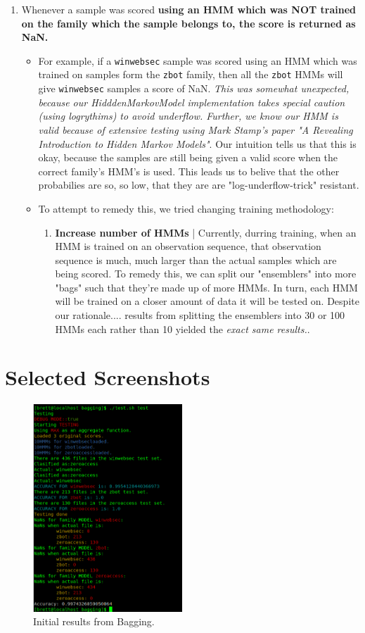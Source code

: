 \documentclass[12pt]{article}
\begin{document}
  \begin{enumerate}
    \item Whenever a sample was scored \textbf{using an HMM which was NOT trained on the family which the sample belongs to, the score is returned as NaN.} 
      \begin{itemize}
        \item For example, if a \texttt{winwebsec} sample was scored using an HMM which was trained on samples form the \texttt{zbot} family, then all the \texttt{zbot} HMMs will give \texttt{winwebsec} samples a score of NaN. \textit{This was somewhat unexpected, because our HidddenMarkovModel implementation takes special caution (using logrythims) to avoid underflow. Further, we know our HMM is valid because of extensive testing using Mark Stamp's paper "A Revealing Introduction to Hidden Markov Models"}. Our intuition tells us that this is okay, because the samples are still being given a valid score when the correct family's HMM's is used. This leads us to belive that the other probabilies are so, so low, that they are are "log-underflow-trick" resistant.
        \item To attempt to remedy this, we tried changing training methodology:
          \begin{enumerate}
            \item \textbf{Increase number of HMMs} | Currently, durring training, when an HMM is trained on an observation sequence, that observation sequence is much, much larger than the actual samples which are being scored. To remedy this, we can split our "ensemblers" into more "bags" such that they're made up of more HMMs. In turn, each HMM will be trained on a closer amount of data it will be tested on. Despite our rationale.... results from splitting the ensemblers into 30 or 100 HMMs each rather than 10 yielded the \textit{exact same results.}.
          \end{enumerate}
     \end{itemize}
  \end{enumerate}

\appendix

\section{Selected Screenshots}
  
          \begin{figure}[H]
          \centering
          \includegraphics[width=0.5\textwidth]{bagging1.png}
          \caption{Initial results from Bagging.}
          \label{bagging1}
          \end{figure}
 
\end{document}
